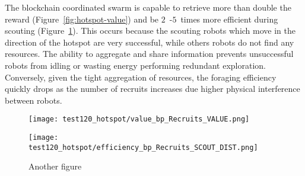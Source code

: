 \documentclass[runningheads]{llncs}
\newcommand{\todo}[1]{\textcolor{red}{\textbf{TODO: #1}}}
\begin{document}
The blockchain coordinated swarm is capable to retrieve more than double the reward (Figure~\ref{fig:hotspot-value}) and be $2$~-$5$~times more efficient during scouting (Figure~\ref{fig:hotspot-eff-exp}). This occurs because the scouting robots which move in the direction of the hotspot are very successful, while others robots do not find any resources. The ability to aggregate and share information prevents unsuccessful robots from idling or wasting energy performing redundant exploration. Conversely, given the tight aggregation of resources, the foraging efficiency quickly drops as the number of recruits increases due higher physical interference between robots. %

\begin{figure}
\centering
\begin{minipage}{.495\textwidth}
  \centering
  \texttt{[image: test120\_hotspot/value\_bp\_Recruits\_VALUE.png]}
  \caption{}
  \label{fig:hotspot-value}
\end{minipage}
\begin{minipage}{.495\textwidth}
  \centering
  \texttt{[image: test120\_hotspot/efficiency\_bp\_Recruits\_SCOUT\_DIST.png]}
  \caption{Another figure}
  \label{fig:hotspot-eff-exp}
\end{minipage}
\end{figure}



\end{document}
